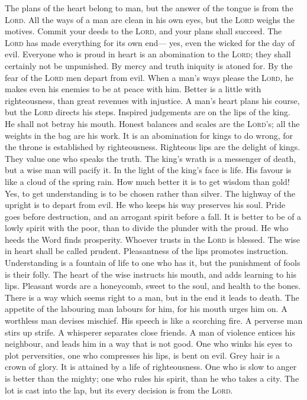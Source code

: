 The plans of the heart belong to man, but the answer of
the tongue is from the \textsc{Lord}.  All the ways of a
man are clean in his own eyes, but the \textsc{Lord} weighs the motives.
 Commit your deeds to the \textsc{Lord}, and your plans
shall succeed.  The \textsc{Lord} has made everything for
its own end--- yes, even the wicked for the day of evil. 
Everyone who is proud in heart is an abomination to the \textsc{Lord};
they shall certainly not be unpunished.  By mercy and
truth iniquity is atoned for. By the fear of the \textsc{Lord} men
depart from evil.  When a man's ways please the
\textsc{Lord}, he makes even his enemies to be at peace with him.
 Better is a little with righteousness, than great
revenues with injustice.  A man's heart plans his course,
but the \textsc{Lord} directs his steps.  Inspired
judgements are on the lips of the king. He shall not betray his mouth.
 Honest balances and scales are the \textsc{Lord}'s; all
the weights in the bag are his work.  It is an
abomination for kings to do wrong, for the throne is established by
righteousness.  Righteous lips are the delight of kings.
They value one who speaks the truth.  The king's wrath is
a messenger of death, but a wise man will pacify it.  In
the light of the king's face is life. His favour is like a cloud of the
spring rain.  How much better it is to get wisdom than
gold! Yes, to get understanding is to be chosen rather than silver.
 The highway of the upright is to depart from evil. He
who keeps his way preserves his soul.  Pride goes before
destruction, and an arrogant spirit before a fall.  It is
better to be of a lowly spirit with the poor, than to divide the plunder
with the proud.  He who heeds the Word finds prosperity.
Whoever trusts in the \textsc{Lord} is blessed.  The wise
in heart shall be called prudent. Pleasantness of the lips promotes
instruction.  Understanding is a fountain of life to one
who has it, but the punishment of fools is their folly. 
The heart of the wise instructs his mouth, and adds learning to his
lips.  Pleasant words are a honeycomb, sweet to the soul,
and health to the bones.  There is a way which seems
right to a man, but in the end it leads to death.  The
appetite of the labouring man labours for him, for his mouth urges him
on.  A worthless man devises mischief. His speech is like
a scorching fire.  A perverse man stirs up strife. A
whisperer separates close friends.  A man of violence
entices his neighbour, and leads him in a way that is not good.
 One who winks his eyes to plot perversities, one who
compresses his lips, is bent on evil.  Grey hair is a
crown of glory. It is attained by a life of righteousness.
 One who is slow to anger is better than the mighty; one
who rules his spirit, than he who takes a city.  The lot
is cast into the lap, but its every decision is from the \textsc{Lord}.

